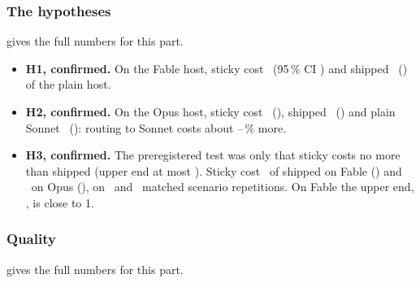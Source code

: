 \subsubsection{The hypotheses}

 gives the full numbers for this part.

\begin{table}[tbp]
\centering\small
\caption{The preregistered hypotheses, test split, pair reading. The arm reading gives the same verdicts.}
\label{vt:tab:hyp}

\end{table}

\begin{itemize}
  \item \textbf{H1, confirmed.} On the Fable host, sticky cost \CfFableStickyPair\X\ (95\,\% CI
    \CfFableStickyPairCI) and shipped \CfFableShippedPair\X\ (\CfFableShippedPairCI) of the plain host.
  \item \textbf{H2, confirmed.} On the Opus host, sticky cost \CfOpusStickyPair\X\ (\CfOpusStickyPairCI),
    shipped \CfOpusShippedPair\X\ (\CfOpusShippedPairCI) and plain Sonnet \CfOpusSonnetPair\X\
    (\CfOpusSonnetPairCI): routing to Sonnet costs about \CfOpusStickyExtra--\CfOpusSonnetExtra\,\% more.
  \item \textbf{H3, confirmed.} The preregistered test was only that sticky costs no more than shipped
    (upper end at most \HThreeUpper). Sticky cost \HThreeFable\X\ of shipped on Fable (\HThreeFableCI) and
    \HThreeOpus\X\ on Opus (\HThreeOpusCI), on \HThreeFableN\ and \HThreeOpusN\ matched scenario
    repetitions. On Fable the upper end, \HThreeFableUpper, is close to 1.
\end{itemize}

\subsubsection{Quality}

 gives the full numbers for this part.

\begin{table}[tbp]
\centering\small
\caption{Quality: mean difference in turn-pass fraction, arm minus plain host, test split, all quality-valid
pairs. Non-inferior when the lower end of the interval is above \NIMargin.}
\label{vt:tab:quality}

\end{table}

